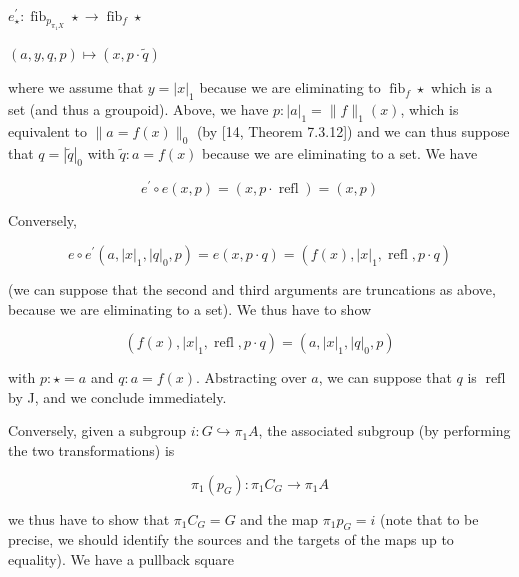 \par  \quad  $\displaystyle e^{\prime}_{\star}:\operatorname{fib}_{p_{\pi_{1}X}}\star$\quad  $\displaystyle\to\operatorname{fib}_{f}\star$\quad  \quad  
 
\par  \quad  $\displaystyle(a,y,q,p)$\quad  $\displaystyle\mapsto(x,p\cdot\tilde{q})$\quad  \quad  
  
where we assume that $y=|x|_{1}$ because we are eliminating to $\operatorname{fib}_{f}\star$ which is a set (and thus a groupoid). Above, we have $p:|a|_{1}=\|f\|_{1}(x)$, which is equivalent to $\|a=f(x)\|_{0}$ (by [14, Theorem 7.3.12]) and we can thus suppose that $q=|\tilde{q}|_{0}$ with $\tilde{q}:a=f(x)$ because we are eliminating to a set. We have\par
  
\par  \quad  \[e^{\prime}\circ e(x,p)=(x,p\cdot\operatorname{refl})=(x,p)\]\quad  \quad  
  
Conversely,\par
  
\par  \quad  \[e\circ e^{\prime}(a,|x|_{1},|q|_{0},p)=e(x,p\cdot q)=(f(x),|x|_{1},\operatorname{refl},p\cdot q)\]\quad  \quad  
  
(we can suppose that the second and third arguments are truncations as above, because we are eliminating to a set). We thus have to show\par
  
\par  \quad  \[(f(x),|x|_{1},\operatorname{refl},p\cdot q)=(a,|x|_{1},|q|_{0},p)\]\quad  \quad  
  
with $p:\star=a$ and $q:a=f(x)$. Abstracting over $a$, we can suppose that $q$ is $\operatorname{refl}$ by J, and we conclude immediately.\par
 
 
 
Conversely, given a subgroup $i:G\hookrightarrow\pi_{1}A$, the associated subgroup (by performing the two transformations) is\par
  
\par  \quad  \[\pi_{1}(p_{G}):\pi_{1}C_{G}\to\pi_{1}A\]\quad  \quad  
  
we thus have to show that $\pi_{1}C_{G}=G$ and the map $\pi_{1}p_{G}=i$ (note that to be precise, we should identify the sources and the targets of the maps up to equality). We have a pullback square\par
  
